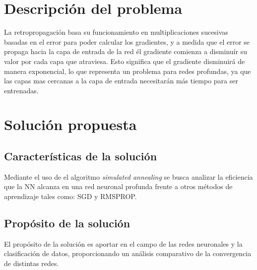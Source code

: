 

\section{Descripción del problema}
La retropropagación basa su funcionamiento en multiplicaciones sucesivas basadas en el error para poder calcular los gradientes, y a medida que el error se propaga hacia la capa de entrada de la red él gradiente comienza a disminuír su valor por cada capa que atraviesa. Esto significa que el gradiente disminuirá de manera exponencial, lo que representa un problema para redes profundas, ya que las capas mas cercanas a la capa de entrada necesitarán más tiempo para ser entrenadas.

\section{Solución propuesta}
\subsection{Características de la solución}
Mediante el uso de el algoritmo {\em simulated annealing} se busca analizar la eficiencia que la NN alcanza en una red neuronal profunda frente a otros métodos de aprendizaje tales como: SGD y RMSPROP.

\subsection{Propósito de la solución}
El propósito de la solución es aportar en el campo de las redes neuronales y la clasificación de datos, proporcionando un análisis comparativo de la convergencia de distintas redes.

